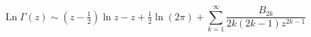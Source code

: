 \[\operatorname{Ln}\Gamma\left(z\right)\sim\left(z-\tfrac{1}{2}\right)\ln z-z+%
\tfrac{1}{2}\ln\left(2\pi\right)+\sum_{k=1}^{\infty}\frac{B_{2k}}{2k(2k-1)z^{2%
k-1}}\]